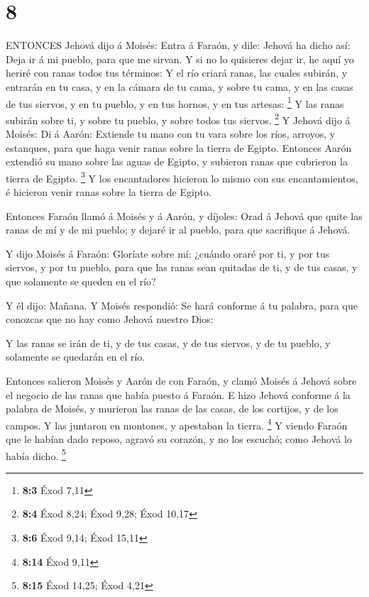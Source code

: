 \hypertarget{section-7}{%
\section{8}\label{section-7}}

 ENTONCES Jehová dijo á Moisés: Entra á Faraón, y dile:
Jehová ha dicho así: Deja ir á mi pueblo, para que me sirvan.
 Y si no lo quisieres dejar ir, he aquí yo heriré con ranas
todos tus términos:  Y el río criará ranas, las cuales
subirán, y entrarán en tu casa, y en la cámara de tu cama, y sobre tu
cama, y en las casas de tus siervos, y en tu pueblo, y en tus hornos, y
en tus artesas: \footnote{\textbf{8:3} Éxod 7,11}  Y las
ranas subirán sobre ti, y sobre tu pueblo, y sobre todos tus siervos.
\footnote{\textbf{8:4} Éxod 8,24; Éxod 9,28; Éxod 10,17}  Y
Jehová dijo á Moisés: Di á Aarón: Extiende tu mano con tu vara sobre los
ríos, arroyos, y estanques, para que haga venir ranas sobre la tierra de
Egipto.  Entonces Aarón extendió su mano sobre las aguas de
Egipto, y subieron ranas que cubrieron la tierra de Egipto. \footnote{\textbf{8:6}
  Éxod 9,14; Éxod 15,11}  Y los encantadores hicieron lo
mismo con sus encantamientos, é hicieron venir ranas sobre la tierra de
Egipto.

 Entonces Faraón llamó á Moisés y á Aarón, y díjoles: Orad á
Jehová que quite las ranas de mí y de mi pueblo; y dejaré ir al pueblo,
para que sacrifique á Jehová.

 Y dijo Moisés á Faraón: Gloríate sobre mí: ¿cuándo oraré
por ti, y por tus siervos, y por tu pueblo, para que las ranas sean
quitadas de ti, y de tus casas, y que solamente se queden en el río?

 Y él dijo: Mañana. Y Moisés respondió: Se hará conforme á
tu palabra, para que conozcas que no hay como Jehová nuestro Dios:

 Y las ranas se irán de ti, y de tus casas, y de tus
siervos, y de tu pueblo, y solamente se quedarán en el río.

 Entonces salieron Moisés y Aarón de con Faraón, y clamó
Moisés á Jehová sobre el negocio de las ranas que había puesto á Faraón.
 E hizo Jehová conforme á la palabra de Moisés, y murieron
las ranas de las casas, de los cortijos, y de los campos. 
Y las juntaron en montones, y apestaban la tierra. \footnote{\textbf{8:14}
  Éxod 9,11}  Y viendo Faraón que le habían dado reposo,
agravó su corazón, y no los escuchó; como Jehová lo había dicho.
\footnote{\textbf{8:15} Éxod 14,25; Éxod 4,21}

